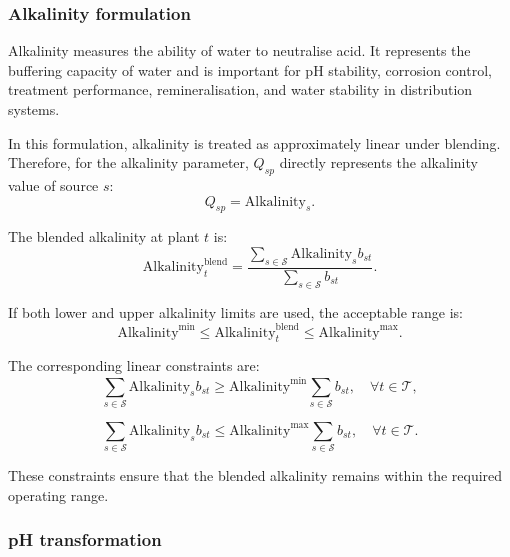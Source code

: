 \documentclass[10pt]{article}
\begin{document}
\subsubsection{Alkalinity formulation}

Alkalinity measures the ability of water to neutralise acid. It represents the
buffering capacity of water and is important for pH stability, corrosion control,
treatment performance, remineralisation, and water stability in distribution
systems.

In this formulation, alkalinity is treated as approximately linear under blending.
Therefore, for the alkalinity parameter, $Q_{sp}$ directly represents the
alkalinity value of source $s$:
\begin{equation}
    Q_{sp} = \mathrm{Alkalinity}_s.
\end{equation}

The blended alkalinity at plant $t$ is:
\begin{equation}
    \mathrm{Alkalinity}^{\mathrm{blend}}_{t}
    =
    \frac{
    \sum_{s \in \mathcal{S}} \mathrm{Alkalinity}_s b_{st}
    }{
    \sum_{s \in \mathcal{S}} b_{st}
    }.
\end{equation}

If both lower and upper alkalinity limits are used, the acceptable range is:
\begin{equation}
    \mathrm{Alkalinity}^{\min}
    \leq
    \mathrm{Alkalinity}^{\mathrm{blend}}_{t}
    \leq
    \mathrm{Alkalinity}^{\max}.
\end{equation}

The corresponding linear constraints are:
\begin{equation}
    \sum_{s \in \mathcal{S}} \mathrm{Alkalinity}_s b_{st}
    \geq
    \mathrm{Alkalinity}^{\min}
    \sum_{s \in \mathcal{S}} b_{st},
    \quad \forall t \in \mathcal{T},
\end{equation}

\begin{equation}
    \sum_{s \in \mathcal{S}} \mathrm{Alkalinity}_s b_{st}
    \leq
    \mathrm{Alkalinity}^{\max}
    \sum_{s \in \mathcal{S}} b_{st},
    \quad \forall t \in \mathcal{T}.
\end{equation}

These constraints ensure that the blended alkalinity remains within the required
operating range.

\subsubsection{pH transformation}
\end{document}
